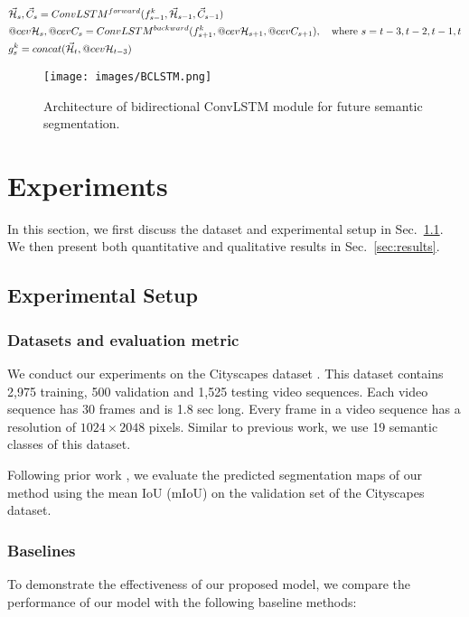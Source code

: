 \documentclass{bmvc2k}
\makeatletter
\DeclareRobustCommand{\cev}[1]{%
  \mathpalette\do@cev{#1}%
}
\newcommand{\do@cev}[2]{%
  \fix@cev{#1}{+}%
  \reflectbox{$\m@th#1\vec{\reflectbox{$\fix@cev{#1}{-}\m@th#1#2\fix@cev{#1}{+}$}}$}%
  \fix@cev{#1}{-}%
}
\newcommand{\fix@cev}[2]{%
  \ifx#1\displaystyle
    \mkern#23mu
  \else
    \ifx#1\textstyle
      \mkern#23mu
    \else
      \ifx#1\scriptstyle
        \mkern#22mu
      \else
        \mkern#22mu
      \fi
    \fi
  \fi
}
\makeatother
\begin{document}
\begin{equation}\label{eq:BiConvLSTM}
\begin{aligned}
& \vec{\mathcal{H}}_{s},\vec{C}_{s} = ConvLSTM^{forward}(f^k_{s-1},\vec{\mathcal{H}}_{s-1},\vec{C}_{s-1})\\
  & \cev{\mathcal{H}}_{s},\cev{C}_{s} = ConvLSTM^{backward}(f^k_{s+1},\cev{\mathcal{H}}_{s+1},\cev{C}_{s+1}), \ \ \textrm { where } s=t-3, t-2, t-1, t\\
& g^k_{s} = concat(\vec{\mathcal{H}}_{t}, \cev{\mathcal{H}}_{t-3}) \\
\end{aligned}
\end{equation}\begin{figure}[t]
\begin{center}
  \texttt{[image: images/BCLSTM.png]}
\end{center}
   \caption{Architecture of bidirectional ConvLSTM module for future semantic segmentation.}
\label{fig:BCLSTM}
\end{figure}
\section{Experiments}\label{sec:exp}
In this section, we first discuss the dataset and experimental setup in Sec.~\ref{sec:setup}. We then present both quantitative and qualitative results in Sec.~\ref{sec:results}.

\subsection{Experimental Setup}\label{sec:setup}\subsubsection{Datasets and evaluation metric}
We conduct our experiments on the Cityscapes dataset \cite{cordts2016cityscapes}. This dataset contains 2,975 training, 500 validation and 1,525 testing video sequences. Each video sequence has 30 frames and is 1.8 sec long. Every frame in a video sequence has a resolution of $1024\times2048$ pixels. Similar to previous work, we use 19 semantic classes of this dataset.

Following prior work \cite{NextSegmPredICCV17,jin2017predicting}, we evaluate the predicted segmentation maps of our method using the mean IoU (mIoU) on the validation set of the Cityscapes dataset.

\subsubsection{Baselines}
To demonstrate the effectiveness of our proposed model, we compare the performance of our model with the following baseline methods:
\end{document}
